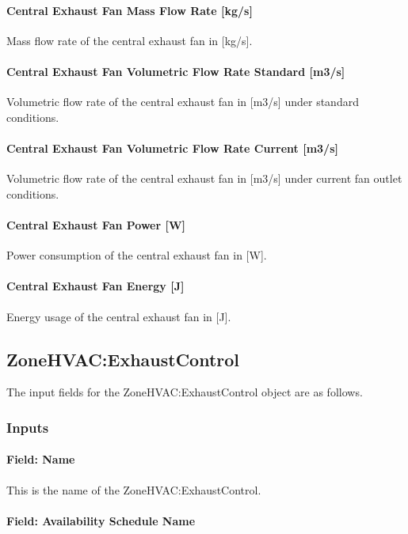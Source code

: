\paragraph{Central Exhaust Fan Mass Flow Rate [kg/s]}
Mass flow rate of the central exhaust fan in [kg/s].

\paragraph{Central Exhaust Fan Volumetric Flow Rate Standard [m3/s]}
Volumetric flow rate of the central exhaust fan in [m3/s] under standard conditions.

\paragraph{Central Exhaust Fan Volumetric Flow Rate Current [m3/s]}
Volumetric flow rate of the central exhaust fan in [m3/s] under current fan outlet conditions.

\paragraph{Central Exhaust Fan Power [W]}
Power consumption of the central exhaust fan in [W].

\paragraph{Central Exhaust Fan Energy [J]}
Energy usage of the central exhaust fan in [J].

\subsection{ZoneHVAC:ExhaustControl}

The input fields for the ZoneHVAC:ExhaustControl object are as follows.

\subsubsection{Inputs}

\paragraph{Field: Name}

This is the name of the ZoneHVAC:ExhaustControl.

\paragraph{Field: Availability Schedule Name}

